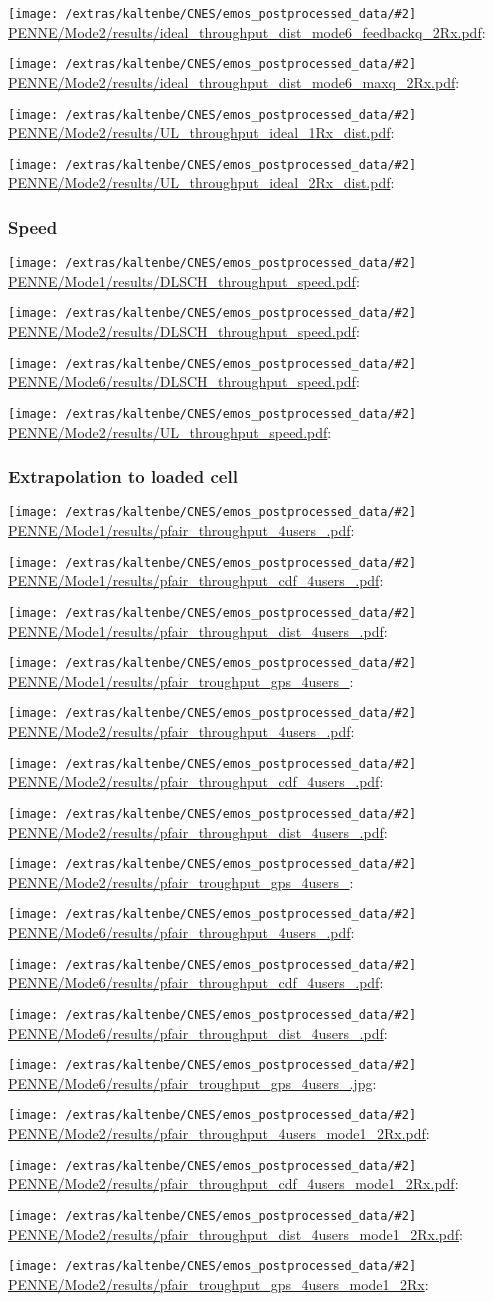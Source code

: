 \documentclass[a4paper,10pt]{article}
\newcommand{\printfile}[2][]{
 \begin{minipage}{8cm}
  \centering
  \texttt{[image: /extras/kaltenbe/CNES/emos\_postprocessed\_data/\#2]}
  \url{#2}: #1

 \end{minipage}
}
\begin{document}
\printfile{PENNE/Mode2/results/ideal_throughput_dist_mode6_feedbackq_2Rx.pdf}
%
\printfile{PENNE/Mode2/results/ideal_throughput_dist_mode6_maxq_2Rx.pdf}

\printfile{PENNE/Mode2/results/UL_throughput_ideal_1Rx_dist.pdf}
\printfile{PENNE/Mode2/results/UL_throughput_ideal_2Rx_dist.pdf}

\subsubsection{Speed}

\printfile{PENNE/Mode1/results/DLSCH_throughput_speed.pdf}
\printfile{PENNE/Mode2/results/DLSCH_throughput_speed.pdf}

\printfile{PENNE/Mode6/results/DLSCH_throughput_speed.pdf}
\printfile{PENNE/Mode2/results/UL_throughput_speed.pdf}

\subsubsection{Extrapolation to loaded cell}

\printfile{PENNE/Mode1/results/pfair_throughput_4users_.pdf}
\printfile{PENNE/Mode1/results/pfair_throughput_cdf_4users_.pdf}

\printfile{PENNE/Mode1/results/pfair_throughput_dist_4users_.pdf}
\printfile{PENNE/Mode1/results/pfair_troughput_gps_4users_}

\printfile{PENNE/Mode2/results/pfair_throughput_4users_.pdf}
\printfile{PENNE/Mode2/results/pfair_throughput_cdf_4users_.pdf}

\printfile{PENNE/Mode2/results/pfair_throughput_dist_4users_.pdf}
\printfile{PENNE/Mode2/results/pfair_troughput_gps_4users_}

\printfile{PENNE/Mode6/results/pfair_throughput_4users_.pdf}
\printfile{PENNE/Mode6/results/pfair_throughput_cdf_4users_.pdf}

\printfile{PENNE/Mode6/results/pfair_throughput_dist_4users_.pdf}
\printfile{PENNE/Mode6/results/pfair_troughput_gps_4users_.jpg}

\printfile{PENNE/Mode2/results/pfair_throughput_4users_mode1_2Rx.pdf}
\printfile{PENNE/Mode2/results/pfair_throughput_cdf_4users_mode1_2Rx.pdf}

\printfile{PENNE/Mode2/results/pfair_throughput_dist_4users_mode1_2Rx.pdf}
\printfile{PENNE/Mode2/results/pfair_troughput_gps_4users_mode1_2Rx}
\end{document}
